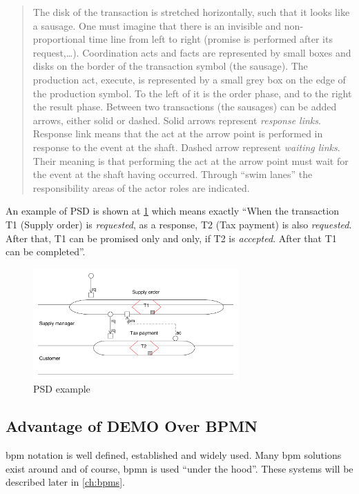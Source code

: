 \begin{quote}
      The disk of the transaction is stretched horizontally, such that it looks like a sausage. One must imagine that there is an invisible and non-proportional time line from left to right (promise is performed after its request,\dots). Coordination acts and facts are represented by small boxes and disks on the border of the transaction symbol (the sausage). 
      The production act, execute, is represented by a small grey box on the edge of the production symbol. To the left of it is the order phase, and to the right the result phase.
      Between two transactions (the sausages) can be added arrows, either solid or dashed. Solid arrows represent \textit{response links}. Response link means that the act at the arrow point is performed in response to the event at the shaft. Dashed arrow represent \textit{waiting links}. Their meaning is that performing the act at the arrow point must wait for the event at the shaft having occurred. Through ``swim lanes'' the responsibility areas of the actor roles are indicated.
\end{quote}
An example of PSD is shown at \cref{fig:psd-example} which means exactly ``When the transaction T1 (Supply order) is \textit{requested}, as a response, T2 (Tax payment) is also \textit{requested}. After that, T1 can be promised only and only, if T2 is \textit{accepted}. After that T1 can be completed''.

\begin{figure}[ht!]
	\centering
    \includegraphics[width=0.7\textwidth]{img/psd-example}
    \caption{PSD example}
    \label{fig:psd-example}
\end{figure}
\subsection{Advantage of DEMO Over BPMN}    
\gls{bpm} notation is well defined, established and widely used. Many \gls{bpm} solutions exist around and of course, \gls{bpmn} is used ``under the hood''. These systems will be described later in \cref{ch:bpms}.

